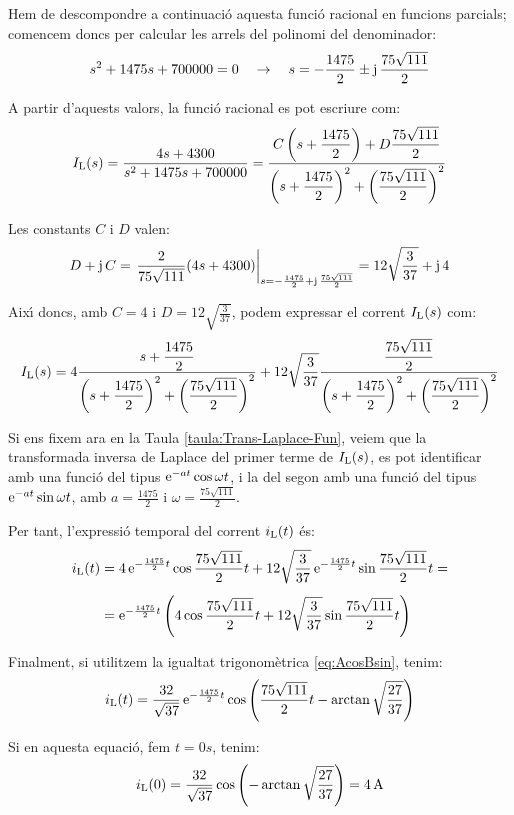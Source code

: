 \begin{exemple}
Hem de descompondre a continuaci\'{o} aquesta funci\'{o} racional en
funcions parcials; comencem doncs per calcular les arrels del
polinomi del denominador:
\[
s^2 +1475 s + 700000 = 0 \quad\rightarrow\quad s= -\frac{1475}{2}
\pm \mathrm{j}\,\frac{75\sqrt{111}}{2}
\]

A partir d'aquests valors, la  funci\'{o} racional es pot escriure com:
\[
    I_\mathrm{L}(s) =
    \frac{4 s+ 4300}{s^2 +1475 s + 700000} =
    \frac{C\left(s+\dfrac{1475}{2}\right)+D\dfrac{75\sqrt{111}}{2}}
    {\left(s+\dfrac{1475}{2}\right)^2+\left(\dfrac{75\sqrt{111}}{2}\right)^2}
\]

Les constants $C$ i $D$ valen:
\[
D + \mathrm{j}\,C = \left.\frac{2}{75\sqrt{111}}(4 s
+4300)\right|_{s=-\frac{1475}{2} + \mathrm{j}\,\frac{75\sqrt{111}}{2}}=
12\sqrt{\frac{3}{37}} +\mathrm{j}\,4
\]

Aix\'{\i} doncs, amb $C=4$ i $D=12\sqrt{\frac{3}{37}}$, podem expressar
el corrent $I_\mathrm{L}(s)$ com:
\[
    I_\mathrm{L}(s) = 4\frac{s+\dfrac{1475}{2}}
    {\left(s+\dfrac{1475}{2}\right)^2+\left(\dfrac{75\sqrt{111}}{2}\right)^2}
    + 12\sqrt{\frac{3}{37}}\frac{\dfrac{75\sqrt{111}}{2}}
    {\left(s+\dfrac{1475}{2}\right)^2+\left(\dfrac{75\sqrt{111}}{2}\right)^2}
\]


 Si ens fixem ara en la Taula \vref{taula:Trans-Laplace-Fun},
veiem que la transformada inversa de Laplace del primer terme de
$I_\mathrm{L}(s)$, es pot identificar amb una funci\'{o} del tipus
$\mathrm{e}^{-at}\cos\omega t$, i la del segon amb una funci\'{o} del tipus
$\mathrm{e}^{-at}\sin\omega t$, amb $a=\frac{1475}{2}$ i
$\omega=\frac{75\sqrt{111}}{2}$.

Per tant, l'expressi\'{o} temporal del corrent $i_\mathrm{L}(t)$ \'{e}s:
\[\begin{split}
    i_\mathrm{L}(t) &= 4\, \mathrm{e}^{-\frac{1475}{2}t} \cos \frac{75\sqrt{111}}{2} t +
    12\sqrt{\frac{3}{37}}\, \mathrm{e}^{-\frac{1475}{2}t} \sin
    \frac{75\sqrt{111}}{2}t = \\[1ex] &= \mathrm{e}^{-\frac{1475}{2}t} \left( 4
    \cos \frac{75\sqrt{111}}{2} t + 12\sqrt{\frac{3}{37}}\sin
    \frac{75\sqrt{111}}{2}t\right)
\end{split}\]

Finalment, si utilitzem la igualtat trigonom\`{e}trica
\eqref{eq:AcosBsin}, tenim:
\[
i_\mathrm{L}(t) = \frac{32}{\sqrt{37}}\,\mathrm{e}^{-\frac{1475}{2}t}
\cos\left(\frac{75\sqrt{111}}{2} t - \arctan
\sqrt{\frac{27}{37}}\right)
\]

Si en aquesta equaci\'{o}, fem $t=0\unit{s}$, tenim:
\[
    i_\mathrm{L}(0) = \frac{32}{\sqrt{37}} \cos\left( - \arctan
\sqrt{\frac{27}{37}}\right) = 4 \mathrm{\,A}
\]


\end{exemple}
